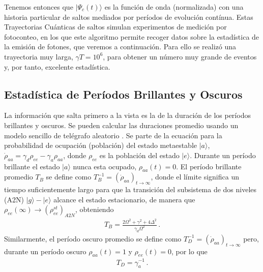 \documentclass[superscriptaddress,12pt,amsmath]{revtex4-2}
\providecommand{\ket}[1]{\lvert #1 \rangle}
\begin{document}
Tenemos entonces que $\ket{\Psi_c (t)}$ es la funci\'on de onda 
(normalizada) con una historia particular de saltos mediados por 
per\'iodos de evoluci\'on cont\'inua. Estas Trayectorias Cu\'anticas de 
saltos simulan experimentos de medici\'on por fotoconteo, en los que 
este algoritmo permite recoger datos sobre la estad\'istica de la emisi\'on 
de fotones, que veremos a continuaci\'on. Para ello se realiz\'o una 
trayectoria muy larga, $\gamma T = 10^6$, para obtener un n\'umero 
muy grande de eventos y, por tanto, excelente estad\'istica. 

\subsection{Estad\'istica de Per\'iodos Brillantes y Oscuros 
\label{ss:PeriodsStats}}
La informaci\'on que salta primero a la vista es la de la duraci\'on de los 
per\'iodos brillantes y oscuros. Se pueden calcular las duraciones 
promedio usando un modelo sencillo de tel\'egrafo aleatorio 
\cite{EvKe02,PeKn88,CaRG16}. Se parte de la ecuaci\'on para la 
probabilidad de ocupaci\'on (poblaci\'on) del estado metaestable $|a\rangle$,
$\dot{\rho}_{aa} = \gamma_d \rho_{ee} - \gamma_a \rho_{aa}$, donde 
$\rho_{ee}$ es la poblaci\'on del estado $|e\rangle$. Durante un per\'iodo 
brillante el estado $|a \rangle$ nunca esta ocupado, $\rho_{aa}(t) =0$. 
El per\'iodo brillante promedio $T_B$ se define como 
$T_B^{-1} = (\dot{\rho}_{aa})_{t \to \infty}$, donde el l\'imite significa un 
tiempo suficientemente largo para que la transici\'on del subsistema de 
dos niveles (A2N) $|g \rangle - |e \rangle$ alcance el estado estacionario, 
de manera que  $\rho_{ee}(\infty) \to (\rho_{ee}^{st})_{A2N}$, obteniendo 
%
\begin{eqnarray}    \label{eq:AvBrightPeriod}
T_B = \frac{2\Omega^2 +\gamma^2 +4\Delta^2}
  	{\gamma_d \Omega^2} \,. 		
\end{eqnarray}
Similarmente, el per\'iodo oscuro promedio se define como  
$T_D^{-1} = (\dot{\rho}_{aa})_{t \to \infty}$ pero, durante un per\'iodo 
oscuro $\rho_{aa}(t) =1$ y $\rho_{ee}(t) = 0$, por lo que  
%
\begin{eqnarray}    \label{eq:AvDarkPeriod}
	T_D = \gamma_a^{-1} 	\,.
\end{eqnarray}
\end{document}

